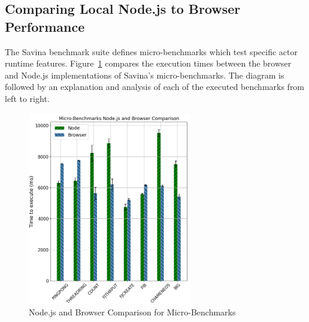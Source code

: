 \documentclass[oneside]{um-fict}
\begin{document}
\subsection{Comparing Local Node.js to Browser Performance}
The Savina benchmark suite defines micro-benchmarks which test specific actor runtime features. Figure~\ref{fig:micro} compares the execution times between the browser and Node.js implementations of Savina's micro-benchmarks. The diagram is followed by an explanation and analysis of each of the executed benchmarks from left to right.
\begin{figure}[H]
    \begin{centering}
        \includegraphics[width=270px]{resources/micro.png}
        \caption{Node.js and Browser Comparison for Micro-Benchmarks}\label{fig:micro}
    \end{centering}
\end{figure}
\end{document}
